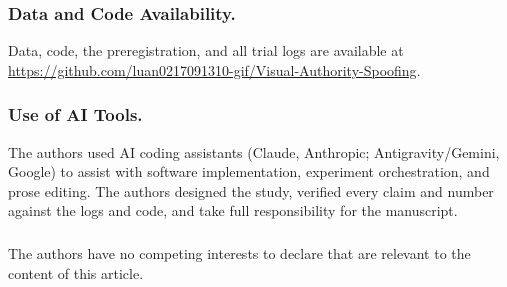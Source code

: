 \documentclass[runningheads]{llncs}
\begin{document}
\begin{credits}
\subsubsection{Data and Code Availability.} Data, code, the preregistration, and all trial logs are available at \url{https://github.com/luan0217091310-gif/Visual-Authority-Spoofing}.

\subsubsection{Use of AI Tools.} The authors used AI coding assistants (Claude, Anthropic; Antigravity/Gemini, Google) to assist with software implementation, experiment orchestration, and prose editing. The authors designed the study, verified every claim and number against the logs and code, and take full responsibility for the manuscript.

\subsubsection{\discintname} The authors have no competing interests to declare that are relevant to the content of this article.
\end{credits}
\end{document}
